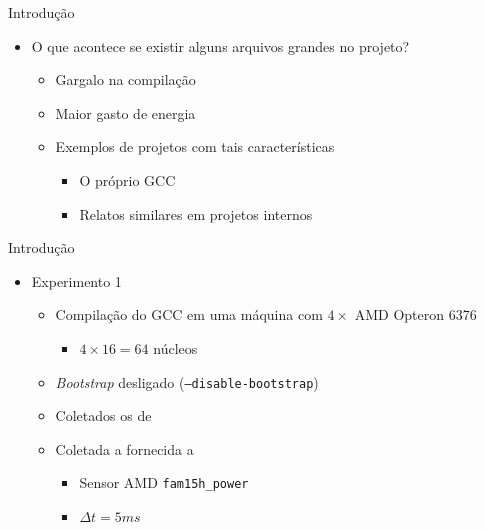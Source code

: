 \begin{frame}{Introdução}
    \begin{itemize}
        \item O que acontece se existir alguns arquivos grandes no projeto?
        \begin{itemize}
            \item Gargalo na compilação
            \item Maior gasto de energia
            \item Exemplos de projetos com tais características
                \begin{itemize}
                    \item O próprio GCC
                    \item Relatos similares em projetos internos \citep{mailgcc}
                \end{itemize}
        \end{itemize}
    \end{itemize}
\end{frame}

\begin{frame}{Introdução}
    \begin{itemize}
        \item Experimento 1
        \begin{itemize}
            \item Compilação do GCC em uma máquina com $4\times$ AMD Opteron 6376
                \begin{itemize}
                    \item $4 \times 16 = 64$ núcleos
                \end{itemize}
            \item \textit{Bootstrap} desligado (\texttt{--disable-bootstrap})
            \item Coletados os {\color{blue}{tempos de compilação}} de {\color{red}{cada arquivo}}
            \item Coletada a {\color{blue}{soma da potência instantânea}} fornecida a {\color{red}{cada processador}}
                \begin{itemize}
                    \item Sensor AMD \texttt{fam15h\_power}
                    \item $\Delta t = 5ms$
                \end{itemize}
        \end{itemize}
    \end{itemize}
\end{frame}

